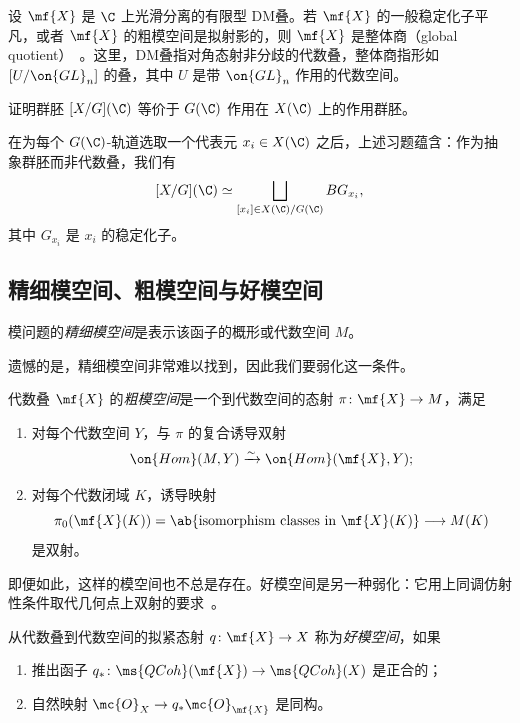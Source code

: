 \begin{exm}
    设 \(\mf{X}\) 是 \(\C\) 上光滑分离的有限型 DM叠。若 \(\mf{X}\) 的一般稳定化子平凡，或者 \(\mf{X}\) 的粗模空间是拟射影的，则 \(\mf{X}\) 是整体商（global quotient）~\cite{EHKV2001}。这里，DM叠指对角态射非分歧的代数叠，整体商指形如 \([U/\on{GL}_n]\) 的叠，其中 \(U\) 是带 \(\on{GL}_n\) 作用的代数空间。
\end{exm}

\begin{exer}
    证明群胚 \([X/G](\C)\) 等价于 \(G(\C)\) 作用在 \(X(\C)\) 上的作用群胚。
\end{exer}

在为每个 \(G(\C)\)-轨道选取一个代表元 \(x_i\in X(\C)\) 之后，上述习题蕴含：作为抽象群胚而非代数叠，我们有
\[ 
    [X/G](\C) \simeq \bigsqcup_{[x_i] \in X(\C)/G(\C)} BG_{x_i}, 
\]
其中 \(G_{x_i}\) 是 \(x_i\) 的稳定化子。


\subsection{精细模空间、粗模空间与好模空间}%
\label{sub:Fine vs coarse vs good moduli spaces}

\begin{defn}
    模问题的\textit{精细模空间}是表示该函子的概形或代数空间 \(M\)。
\end{defn}

遗憾的是，精细模空间非常难以找到，因此我们要弱化这一条件。

\begin{defn}
    代数叠 \(\mf{X}\) 的\textit{粗模空间}是一个到代数空间的态射 \(\pi\colon\mf{X}\to M\)，满足
    \begin{enumerate}
        \item 对每个代数空间 \(Y\)，与 \(\pi\) 的复合诱导双射
        \[
            \on{Hom}(M,Y)\xrightarrow{\sim}\on{Hom}(\mf{X},Y);
        \]
        \item 对每个代数闭域 \(K\)，诱导映射
        \[
            \pi_0(\mf{X}(K))=\ab\{\text{isomorphism classes in }\mf{X}(K)\}
            \longrightarrow M(K)
        \]
        是双射。
    \end{enumerate}
\end{defn}


即便如此，这样的模空间也不总是存在。好模空间是另一种弱化：它用上同调仿射性条件取代几何点上双射的要求~\cite{Alper2013}。

\begin{defn}
    从代数叠到代数空间的拟紧态射 \(q\colon\mf{X}\to X\) 称为\textit{好模空间}，如果
    \begin{enumerate}
        \item 推出函子 \(q_*\colon\ms{QCoh}(\mf{X})\to\ms{QCoh}(X)\) 是正合的；
        \item 自然映射 \(\mc{O}_X\to q_*\mc{O}_{\mf{X}}\) 是同构。
    \end{enumerate}
\end{defn}

